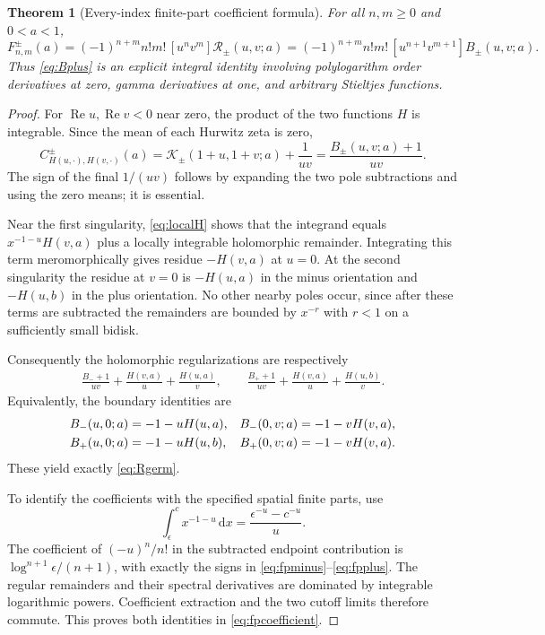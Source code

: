 \documentclass[11pt]{article}
\numberwithin{equation}{section}
\newtheorem{theorem}{Theorem}[section]
\theoremstyle{definition}\newtheorem{definition}[theorem]{Definition}
\theoremstyle{remark}\newtheorem{remark}[theorem]{Remark}
\DeclareMathOperator{\Rea}{Re}
\newcommand{\dd}{\,\mathrm d}
\newcommand{\calK}{\mathcal K}
\newcommand{\calR}{\mathcal R}
\begin{document}
\begin{theorem}[Every-index finite-part coefficient formula]\label{thm:fp}
For all $n,m\ge0$ and $0<a<1$,
\begin{equation}\label{eq:fpcoefficient}
 F^\pm_{n,m}(a)=(-1)^{n+m}n!m!\,[u^nv^m]\calR_\pm(u,v;a)
 =(-1)^{n+m}n!m!\,[u^{n+1}v^{m+1}]B_\pm(u,v;a).
\end{equation}
Thus \eqref{eq:Bplus} is an explicit integral identity involving
polylogarithm order derivatives at zero, gamma derivatives at one, and
arbitrary Stieltjes functions.
\end{theorem}
\begin{proof}
For $\Rea u,\Rea v<0$ near zero, the product of the two functions $H$ is
integrable. Since the mean of each Hurwitz zeta is zero,
\begin{equation}\label{eq:HH}
 C^\pm_{H(u,\cdot),H(v,\cdot)}(a)
 =\calK_\pm(1+u,1+v;a)+\frac1{uv}
 =\frac{B_\pm(u,v;a)+1}{uv}.
\end{equation}
The sign of the final $1/(uv)$ follows by expanding the two pole
subtractions and using the zero means; it is essential.

Near the first singularity, \eqref{eq:localH} shows that the integrand
equals $x^{-1-u}H(v,a)$ plus a locally integrable holomorphic remainder.
Integrating this term meromorphically gives residue $-H(v,a)$ at $u=0$.
At the second singularity the residue at $v=0$ is $-H(u,a)$ in the minus
orientation and $-H(u,b)$ in the plus orientation. No other nearby poles
occur, since after these terms are subtracted the remainders are bounded
by $x^{-r}$ with $r<1$ on a sufficiently small bidisk.

Consequently the holomorphic regularizations are respectively
\begin{align*}
 \frac{B_-+1}{uv}+\frac{H(v,a)}u+\frac{H(u,a)}v,\qquad
 \frac{B_++1}{uv}+\frac{H(v,a)}u+\frac{H(u,b)}v.
\end{align*}
Equivalently, the boundary identities are
\begin{align}\label{eq:boundaries}
 B_-(u,0;a)&=-1-uH(u,a),& B_-(0,v;a)&=-1-vH(v,a),\notag\\
 B_+(u,0;a)&=-1-uH(u,b),& B_+(0,v;a)&=-1-vH(v,a).
\end{align}
These yield exactly \eqref{eq:Rgerm}.

To identify the coefficients with the specified spatial finite parts,
use
\[
 \int_\epsilon^c x^{-1-u}\dd x
 =\frac{\epsilon^{-u}-c^{-u}}u.
\]
The coefficient of $(-u)^n/n!$ in the subtracted endpoint contribution
is $\log^{n+1}\epsilon/(n+1)$, with exactly the signs in
\eqref{eq:fpminus}--\eqref{eq:fpplus}. The regular remainders and their
spectral derivatives are dominated by integrable logarithmic powers.
Coefficient extraction and the two cutoff limits therefore commute.
This proves both identities in \eqref{eq:fpcoefficient}.
\end{proof}
\end{document}
